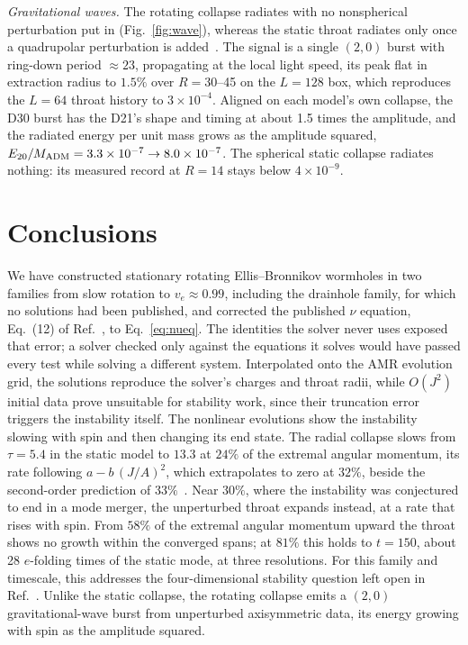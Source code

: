\documentclass[twocolumn,floatfix,aps,prd,superscriptaddress,nofootinbib]{revtex4-2}
\begin{document}
\emph{Gravitational waves.} The rotating collapse radiates with no nonspherical perturbation put in (Fig.~\ref{fig:wave}), whereas the static throat radiates only once a quadrupolar perturbation is added~\cite{shirokov2026c}. The signal is a single $(2,0)$ burst with ring-down period ${\approx}23$, propagating at the local light speed, its peak flat in extraction radius to $1.5\%$ over $R=30$--45 on the $L=128$ box, which reproduces the $L=64$ throat history to $3\times10^{-4}$. Aligned on each model's own collapse, the D30 burst has the D21's shape and timing at about 1.5 times the amplitude, and the radiated energy per unit mass grows as the amplitude squared, $E_{20}/M_{\rm ADM}=3.3\times10^{-7}\to8.0\times10^{-7}$. The spherical static collapse radiates nothing: its measured record at $R=14$ stays below $4\times10^{-9}$.

\section{Conclusions}
\label{sec:conclusions}

We have constructed stationary rotating Ellis--Bronnikov wormholes in two families from slow rotation to $v_e\approx0.99$, including the drainhole family, for which no solutions had been published, and corrected the published $\nu$ equation, Eq.~(12) of Ref.~\cite{chew2016}, to Eq.~\eqref{eq:nueq}. The identities the solver never uses exposed that error; a solver checked only against the equations it solves would have passed every test while solving a different system. Interpolated onto the AMR evolution grid, the solutions reproduce the solver's charges and throat radii, while $O(J^2)$ initial data prove unsuitable for stability work, since their truncation error triggers the instability itself. The nonlinear evolutions show the instability slowing with spin and then changing its end state. The radial collapse slows from $\tau=5.4$ in the static model to $13.3$ at $24\%$ of the extremal angular momentum, its rate following $a-b\,(J/A)^2$, which extrapolates to zero at $32\%$, beside the second-order prediction of $33\%$~\cite{azad2023,azad2024}. Near $30\%$, where the instability was conjectured to end in a mode merger, the unperturbed throat expands instead, at a rate that rises with spin. From $58\%$ of the extremal angular momentum upward the throat shows no growth within the converged spans; at $81\%$ this holds to $t=150$, about 28 $e$-folding times of the static mode, at three resolutions. For this family and timescale, this addresses the four-dimensional stability question left open in Ref.~\cite{kleihaus_kunz2014}. Unlike the static collapse, the rotating collapse emits a $(2,0)$ gravitational-wave burst from unperturbed axisymmetric data, its energy growing with spin as the amplitude squared.
\end{document}
